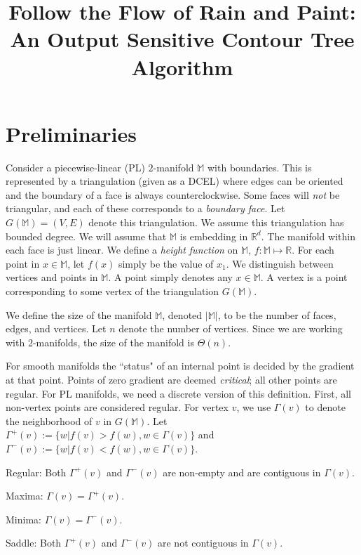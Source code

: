 \documentclass[11pt]{article}
\author{}
\title{Follow the Flow of Rain and Paint: \break An Output Sensitive Contour Tree Algorithm}
\date{}
\theoremstyle{definition}
\newcommand{\innbd}{\Gamma^-}
\newcommand{\nbd}{\Gamma}
\newcommand{\outnbd}{\Gamma^+}
\newcommand{\MM}{\mathbb{M}}
\newcommand{\RR}{\mathbb{R}}
\begin{document}
\maketitle



\section{Preliminaries}
Consider a piecewise-linear (PL) $2$-manifold $\MM$ with boundaries.
This is represented by a triangulation (given as a DCEL) where edges
can be oriented and the boundary of a face is always counterclockwise. Some faces will \emph{not}
be triangular, and each of these corresponds to a \emph{boundary face}.
Let $G(\MM) = (V,E)$ denote this triangulation. We assume this triangulation
has bounded degree.
We will assume that $\MM$ is embedding in $\RR^d$.
The manifold within each face is just linear.
We define a \emph{height function} on $\MM$, $f:\MM \mapsto \RR$. For each point in $x \in \MM$, let $f(x)$ simply be the value of $x_1$.
We distinguish between vertices and points in $\MM$. A point simply denotes any $x \in \MM$. A vertex is a point
corresponding to some vertex of the triangulation $G(\MM)$.

We define the size of the manifold $\MM$, denoted $|\MM|$, to be the number of faces, edges, and vertices.  
Let $n$ denote the number of vertices.  
Since we are working with $2$-manifolds, the size of the manifold is $\Theta(n)$.

For smooth manifolds the ``status" of an internal point is decided by the gradient at that point. 
Points of zero gradient are deemed \emph{critical};
all other points are regular.
For PL manifolds, we need a discrete version of this definition.
First, all non-vertex points are considered regular.
For vertex $v$, we use $\nbd(v)$ to denote the neighborhood of $v$ in $G(\MM)$. Let $\outnbd(v) := \{ w | f(v) > f(w), w \in \Gamma(v)\}$
and $\innbd(v) := \{w | f(v) < f(w), w \in \Gamma(v)\}$. 
\smallskip
\begin{asparaenum}
	\item Regular: Both $\outnbd(v)$ and $\innbd(v)$ are non-empty and are contiguous in $\nbd(v)$.
	\item Maxima: $\nbd(v) = \outnbd(v)$.
	\item Minima: $\nbd(v) = \innbd(v)$.
	\item Saddle: Both $\outnbd(v)$ and $\innbd(v)$ are not contiguous in $\nbd(v)$.
\end{asparaenum}
\smallskip
\end{document}
